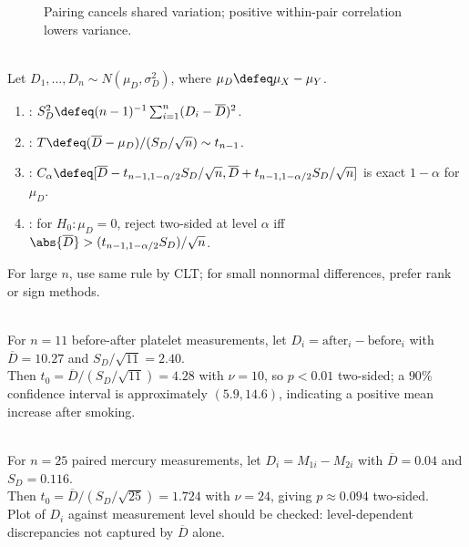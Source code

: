 \begin{figure}[H]
  \centering
  
  \caption{Pairing cancels shared variation; positive within-pair correlation lowers variance.}
  \label{fig:paired-vs-unpaired-variance}
\end{figure}

\begin{method} \label{meth:paired-normal-t-procedure} \\
Let $D_1,\ldots,D_n\sim N(\mu_D,\sigma_D^2)$, where $\mu_D\defeq\mu_X-\mu_Y$.
\begin{enumerate}[label=(\roman*)]
\setlength{\itemsep}{0pt}
\item {}: $S_D^2\defeq(n-1)^{-1}\sum_{i=1}^n(D_i-\overline{D})^2$.
\item {}: $T\defeq(\overline{D}-\mu_D)/(S_D/\sqrt{n})\sim t_{n-1}$.
\item {}: $C_\alpha\defeq[\overline{D}-t_{n-1,1-\alpha/2}S_D/\sqrt{n},\overline{D}+t_{n-1,1-\alpha/2}S_D/\sqrt{n}]$ is exact $1-\alpha$ for $\mu_D$.
\item {}: for $H_0:\mu_D=0$, reject two-sided at level $\alpha$ iff $\abs{\overline{D}}>(t_{n-1,1-\alpha/2}S_D)/\sqrt{n}$.
\end{enumerate}
For large $n$, use same rule by CLT; for small nonnormal differences, prefer rank or sign methods.
\end{method}

\begin{example} \label{ex:platelet-aggregation-paired-t} \\
For $n=11$ before-after platelet measurements, let $D_i=\mathrm{after}_i-\mathrm{before}_i$ with $\overline{D}=10.27$ and $S_D/\sqrt{11}=2.40$.\\
Then $t_0=\overline{D}/(S_D/\sqrt{11})=4.28$ with $\nu=10$, so $p<0.01$ two-sided; a $90\%$ confidence interval is approximately $(5.9,14.6)$, indicating a positive mean increase after smoking.
\end{example}

\begin{example} \label{ex:mercury-methods-paired-analysis} \\
For $n=25$ paired mercury measurements, let $D_i=M_{1i}-M_{2i}$ with $\overline{D}=0.04$ and $S_D=0.116$.\\
Then $t_0=\overline{D}/(S_D/\sqrt{25})=1.724$ with $\nu=24$, giving $p\approx0.094$ two-sided.\\
Plot of $D_i$ against measurement level should be checked: level-dependent discrepancies not captured by $\overline{D}$ alone.
\end{example}

